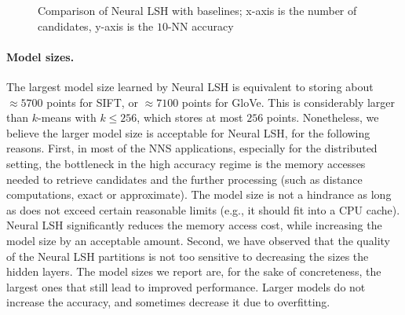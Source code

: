 \documentclass[11pt]{article}
\begin{document}
\begin{figure}
    \caption{Comparison of Neural LSH with baselines; x-axis is the number of candidates, y-axis is the $10$-NN accuracy}%
    \label{piotr_fig:kmeans_plots}
\end{figure}


\paragraph{Model sizes.}
The largest model size learned by Neural LSH is equivalent to storing about $\approx 5700$ points for SIFT, or $\approx 7100$ points for GloVe.%
This is considerably larger than $k$-means with $k\leq256$, which stores at most $256$ points.
Nonetheless, we believe the larger model size is acceptable for Neural LSH, for the following reasons.
    First, in most of the NNS applications, especially for the distributed setting, the bottleneck in the high accuracy regime is the memory accesses needed to retrieve candidates and the further processing (such as distance computations, exact or approximate). The model size is not a hindrance as long as does not exceed certain reasonable limits (e.g., it should fit into a CPU cache).
    Neural LSH significantly reduces the memory access cost, while increasing the model size by an acceptable amount.
    Second, we have observed that the quality of the Neural LSH partitions is not too sensitive to decreasing the sizes
    the hidden layers. The model sizes we report are, for the sake of concreteness, the largest ones that still lead to improved performance. Larger models do not increase the accuracy, and sometimes decrease it due to overfitting.
\end{document}
